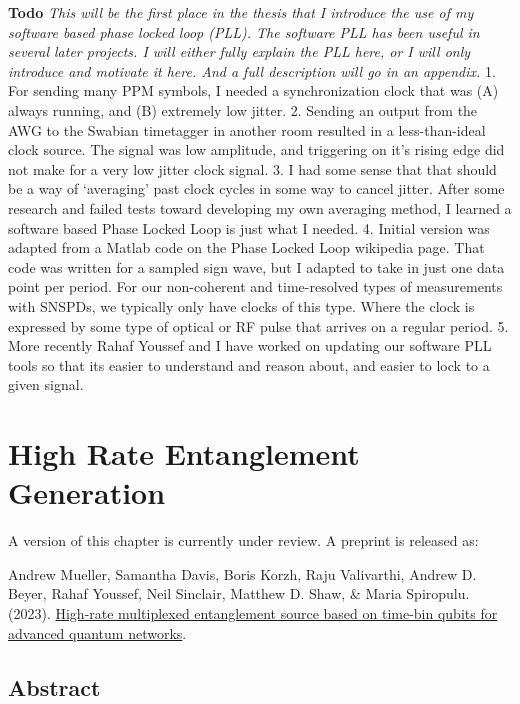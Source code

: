 \documentclass[11pt]{caltech_thesis} %
\begin{document}
\textbf{Todo}
\emph{This will be the first place in the thesis that I introduce the use of my software based phase locked loop (PLL). The software PLL has been useful in several later projects. I will either fully explain the PLL here, or I will only introduce and motivate it here. And a full description will go in an appendix. }
1. For sending many PPM symbols, I needed a synchronization clock that was (A) always running, and (B) extremely low jitter.
2. Sending an output from the AWG to the Swabian timetagger in another room resulted in a less-than-ideal clock source. The signal was low amplitude, and triggering on it's rising edge did not make for a very low jitter clock signal.
3. I had some sense that that should be a way of `averaging' past clock cycles in some way to cancel jitter. After some research and failed tests toward developing my own averaging method, I learned a software based Phase Locked Loop is just what I needed.
4. Initial version was adapted from a Matlab code on the Phase Locked Loop wikipedia page. That code was written for a sampled sign wave, but I adapted to take in just one data point per period. For our non-coherent and time-resolved types of measurements with SNSPDs, we typically only have clocks of this type. Where the clock is expressed by some type of optical or RF pulse that arrives on a regular period.
5. More recently Rahaf Youssef and I have worked on updating our software PLL tools so that its easier to understand and reason about, and easier to lock to a given signal.

\hypertarget{high-rate-entanglement-generation}{%
\chapter{High Rate Entanglement Generation}\label{high-rate-entanglement-generation}}

A version of this chapter is currently under review. A preprint is released as:

Andrew Mueller, Samantha Davis, Boris Korzh, Raju Valivarthi, Andrew D. Beyer, Rahaf Youssef, Neil Sinclair, Matthew D. Shaw, \& Maria Spiropulu. (2023). \href{https://arxiv.org/abs/2310.01804}{High-rate multiplexed entanglement source based on time-bin qubits for advanced quantum networks}.

\hypertarget{abstract-3}{%
\section{Abstract}\label{abstract-3}}
\end{document}
